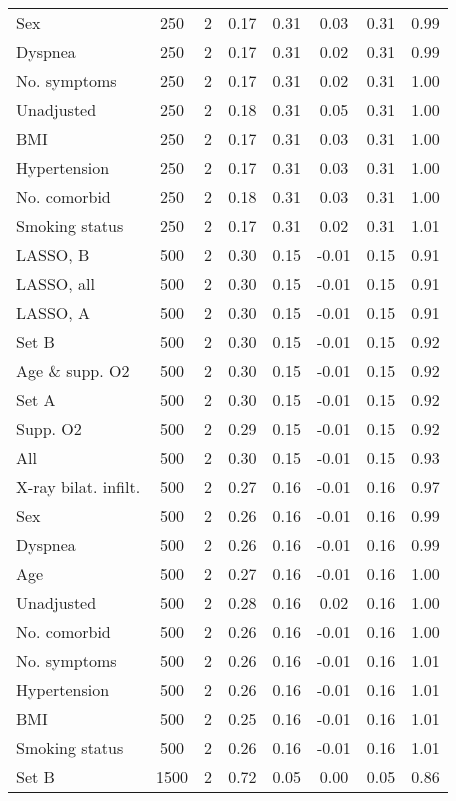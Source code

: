 \documentclass{article}
\begin{document}
\begin{table}[htbp]
{\begin{tabular}{lccccccc}
Sex & 250 & 2 & 0.17 & 0.31 & 0.03 & 0.31 & 0.99\\
Dyspnea & 250 & 2 & 0.17 & 0.31 & 0.02 & 0.31 & 0.99\\
No. symptoms & 250 & 2 & 0.17 & 0.31 & 0.02 & 0.31 & 1.00\\
Unadjusted & 250 & 2 & 0.18 & 0.31 & 0.05 & 0.31 & 1.00\\
BMI & 250 & 2 & 0.17 & 0.31 & 0.03 & 0.31 & 1.00\\
Hypertension & 250 & 2 & 0.17 & 0.31 & 0.03 & 0.31 & 1.00\\
No. comorbid & 250 & 2 & 0.18 & 0.31 & 0.03 & 0.31 & 1.00\\
Smoking status & 250 & 2 & 0.17 & 0.31 & 0.02 & 0.31 & 1.01\\ \midrule
LASSO, B & 500 & 2 & 0.30 & 0.15 & -0.01 & 0.15 & 0.91\\
LASSO, all & 500 & 2 & 0.30 & 0.15 & -0.01 & 0.15 & 0.91\\
LASSO, A & 500 & 2 & 0.30 & 0.15 & -0.01 & 0.15 & 0.91\\
Set B & 500 & 2 & 0.30 & 0.15 & -0.01 & 0.15 & 0.92\\
Age \& supp. O2 & 500 & 2 & 0.30 & 0.15 & -0.01 & 0.15 & 0.92\\
Set A & 500 & 2 & 0.30 & 0.15 & -0.01 & 0.15 & 0.92\\
Supp. O2 & 500 & 2 & 0.29 & 0.15 & -0.01 & 0.15 & 0.92\\
All & 500 & 2 & 0.30 & 0.15 & -0.01 & 0.15 & 0.93\\
X-ray bilat. infilt. & 500 & 2 & 0.27 & 0.16 & -0.01 & 0.16 & 0.97\\
Sex & 500 & 2 & 0.26 & 0.16 & -0.01 & 0.16 & 0.99\\
Dyspnea & 500 & 2 & 0.26 & 0.16 & -0.01 & 0.16 & 0.99\\
Age & 500 & 2 & 0.27 & 0.16 & -0.01 & 0.16 & 1.00\\
Unadjusted & 500 & 2 & 0.28 & 0.16 & 0.02 & 0.16 & 1.00\\
No. comorbid & 500 & 2 & 0.26 & 0.16 & -0.01 & 0.16 & 1.00\\
No. symptoms & 500 & 2 & 0.26 & 0.16 & -0.01 & 0.16 & 1.01\\
Hypertension & 500 & 2 & 0.26 & 0.16 & -0.01 & 0.16 & 1.01\\
BMI & 500 & 2 & 0.25 & 0.16 & -0.01 & 0.16 & 1.01\\
Smoking status & 500 & 2 & 0.26 & 0.16 & -0.01 & 0.16 & 1.01\\ \midrule
Set B & 1500 & 2 & 0.72 & 0.05 & 0.00 & 0.05 & 0.86\\

\end{tabular}}
\end{table}
\end{document}
